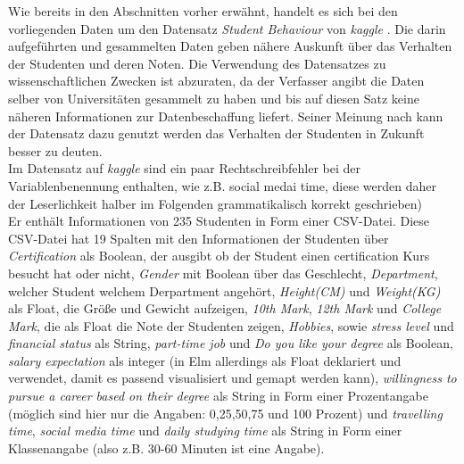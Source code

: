 \documentclass[usegeometry=true]{scrartcl}
\begin{document}
Wie bereits in den Abschnitten vorher erwähnt, handelt es sich bei den vorliegenden Daten um den Datensatz \textit{Student Behaviour} von \textit{kaggle} . Die darin aufgeführten und gesammelten Daten geben nähere Auskunft über das Verhalten der Studenten und deren Noten. Die Verwendung des Datensatzes zu wissenschaftlichen Zwecken ist abzuraten, da der Verfasser angibt die Daten selber von Universitäten gesammelt zu haben und bis auf diesen Satz keine näheren Informationen zur Datenbeschaffung liefert. Seiner Meinung nach kann der Datensatz dazu genutzt werden das Verhalten der Studenten in Zukunft besser zu deuten.\\
Im Datensatz auf \textit{kaggle} sind ein paar Rechtschreibfehler bei der Variablenbenennung enthalten, wie z.B. \glqq social medai time\grqq , diese werden daher der Leserlichkeit halber im Folgenden grammatikalisch korrekt geschrieben)
\\
Er enthält Informationen von 235 Studenten in Form einer CSV-Datei. Diese CSV-Datei hat 19 Spalten mit den Informationen der Studenten über \textit{Certification} als Boolean, der ausgibt ob der Student einen certification Kurs besucht hat oder nicht, \textit{Gender} mit Boolean über das Geschlecht, \textit{Department}, welcher Student welchem Derpartment angehört, \textit{Height(CM)} und \textit{Weight(KG)} als Float, die Größe und Gewicht aufzeigen, \textit{10th Mark}, \textit{12th Mark} und \textit{College Mark}, die als Float die Note der Studenten zeigen, \textit{Hobbies}, sowie \textit{stress level} und \textit{financial status} als String, \textit{part-time job} und \textit{Do you like your degree} als Boolean, \textit{salary expectation} als integer (in Elm allerdings als Float deklariert und verwendet, damit es passend visualisiert und gemapt werden kann), \textit{willingness to pursue a career based on their degree } als String in Form einer Prozentangabe (möglich sind hier nur die Angaben: 0,25,50,75 und 100 Prozent) und \textit{travelling time}, \textit{social media time} und \textit{daily studying time} als String in Form einer Klassenangabe (also z.B. 30-60 Minuten ist eine Angabe).
\end{document}
